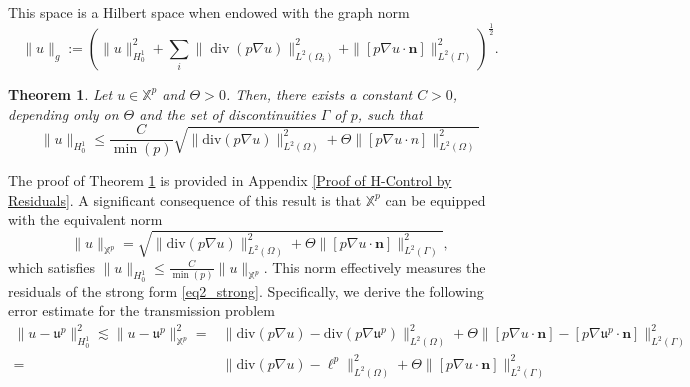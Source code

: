 \documentclass[oneside]{article}
\newtheorem{theorem}{Theorem}[section]
\newcommand{\blue}[1]{{\color{blue}{#1}}}
\begin{document}
This space is a Hilbert space when endowed with the graph norm
\begin{equation}\label{eq2_graph norm}
\|u\|_g:=\left(\|u\|_{H^1_0}^2+\sum\limits_{i}\| \operatorname{div}(p\nabla u)\|_{L^2(\Omega_i)}^2 + \|[p\nabla u\cdot \mathbf{n}]\|_{L^2(\Gamma)}^2\right)^\frac{1}{2}. 
\end{equation}
\begin{theorem}\label{2_Theorem_1}
Let $u\in \mathbb{X}^p$ and $\Theta>0$. Then, there exists a constant $C>0$, depending only on $\Theta$ and the set of discontinuities $\Gamma$ of $p$, such that 
\begin{equation}
    \|u\|_{H^1_0}\leq \frac{C}{\min(p)}\sqrt{\|\text{div}(p\nabla u)\|_{L^2(\Omega)}^2 + \Theta\|[p\nabla u \cdot n]\|_{L^2(\Omega)}^2}
\end{equation}
\end{theorem}
\noindent The proof of Theorem \ref{2_Theorem_1} is provided in Appendix \ref{Proof of H-Control by Residuals}. A significant consequence of this result is that $\mathbb{X}^p$ can be equipped with the equivalent norm 
\begin{equation}\label{eq2_Xp_norm}
    \|u\|_{\mathbb{X}^p} = \sqrt{ \|\text{div}(p\nabla u)\|_{L^2(\Omega)}^2 + \Theta\|[p\nabla u\cdot \mathbf{n}]\|_{L^2(\Gamma)}^2},
\end{equation}
which satisfies $\|u\|_{H^1_0}\leq \frac{C}{\min(p)} \|u\|_{\mathbb{X}^p}$. This norm effectively measures the residuals of the strong form \eqref{eq2_strong}. 
Specifically, we derive the following error estimate for the transmission problem
\begin{equation}\label{eq2_upper bound}
\begin{split}
\|u-\mathfrak{u}^p\|_{H^1_0}^2\lesssim \|u-\mathfrak{u}^p\|_{\mathbb{X}^p}^2 =& \|\text{div}(p\nabla u)-\text{div}(p\nabla \mathfrak{u}^p)\|_{L^2(\Omega)}^2 + \Theta \|[p\nabla u\cdot \mathbf{n}]-[p\nabla \mathfrak{u}^p\cdot \mathbf{n}]\|_{L^2(\Gamma)}^2\\
= & \|\text{div}(p\nabla u)-\ell ^p\|_{L^2(\Omega)}^2 + \Theta\|[p\nabla u\cdot \mathbf{n}]\|_{L^2(\Gamma)}^2
\end{split}
\end{equation}
\end{document}
